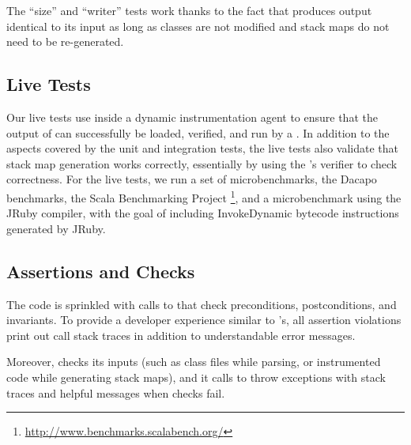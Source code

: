 The ``size'' and ``writer'' tests work thanks to the fact that 
\jnif{} produces output identical to its input 
as long as classes are not modified and stack maps do not need to be re-generated.


\subsection*{Live Tests}

Our live tests use \jnif{} inside a \jvmti{} dynamic instrumentation agent
to ensure that the output of \jnif{} can successfully be loaded,
verified, and run by a \jvm{}.
In addition to the aspects covered by the unit and integration tests,
the live tests also validate that stack map generation works correctly,
essentially by using the \jvm{}'s verifier to check correctness.
For the live tests, we run a set of microbenchmarks, 
the Dacapo benchmarks, the Scala Benchmarking Project%
\footnote{\url{http://www.benchmarks.scalabench.org/}},
and a microbenchmark using the JRuby compiler,
with the goal of including InvokeDynamic bytecode instructions generated by JRuby.


\subsection*{Assertions and Checks}

The \jnif{} code is sprinkled with calls to  
that check preconditions, postconditions, and invariants.
To provide a developer experience similar to \java{}'s,
all assertion violations print out call stack traces in addition to understandable error messages.

Moreover, \jnif{} checks its inputs (such as class files while parsing, or instrumented code while generating stack maps),
and it calls  to throw exceptions with stack traces and helpful messages
when checks fail.
